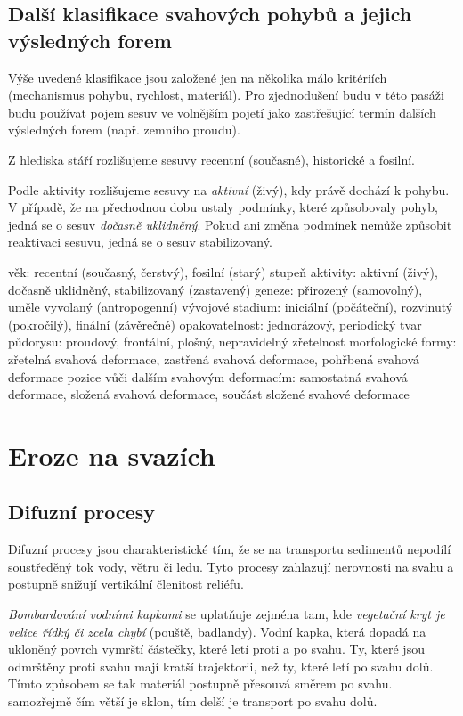 \subsection{Další klasifikace svahových pohybů a jejich výsledných forem}
Výše uvedené klasifikace jsou založené jen na několika málo kritériích (mechanismus pohybu, rychlost, materiál). Pro zjednodušení budu v této pasáži budu používat pojem sesuv ve volnějším pojetí jako zastřešující termín dalších výsledných forem (např. zemního proudu).

Z hlediska stáří rozlišujeme sesuvy recentní (současné), historické a fosilní.

Podle aktivity rozlišujeme sesuvy na \emph{aktivní} (živý), kdy právě dochází k pohybu. V případě, že na přechodnou dobu ustaly podmínky, které způsobovaly pohyb, jedná se o sesuv \emph{dočasně uklidněný}. Pokud ani změna podmínek nemůže způsobit reaktivaci sesuvu, jedná se o sesuv stabilizovaný.

věk: recentní (současný, čerstvý), fosilní (starý)
stupeň aktivity: aktivní (živý), dočasně uklidněný, stabilizovaný (zastavený)
geneze: přirozený (samovolný), uměle vyvolaný (antropogenní)
vývojové stadium: iniciální (počáteční), rozvinutý (pokročilý), finální (závěrečné)
opakovatelnost: jednorázový, periodický
tvar půdorysu: proudový, frontální, plošný, nepravidelný
zřetelnost morfologické formy: zřetelná svahová deformace, zastřená svahová deformace, pohřbená svahová deformace
pozice vůči dalším svahovým deformacím: samostatná svahová deformace, složená svahová deformace, součást složené svahové deformace



\section{Eroze na svazích}

\subsection{Difuzní procesy}
Difuzní procesy jsou charakteristické tím, že  se na transportu sedimentů nepodílí soustředěný tok vody, větru či ledu. Tyto procesy zahlazují nerovnosti na svahu a postupně snižují vertikální členitost reliéfu. 

\emph{Bombardování vodními kapkami} se uplatňuje zejména tam, kde \emph{vegetační kryt je velice řídký či zcela chybí} (pouště, badlandy). Vodní kapka, která dopadá na ukloněný povrch vymrští částečky, které letí proti a po svahu. Ty, které jsou odmrštěny proti svahu mají kratší trajektorii, než ty, které letí po svahu dolů. Tímto způsobem se tak materiál postupně přesouvá směrem po svahu. samozřejmě čím větší je sklon, tím delší je transport po svahu dolů.

